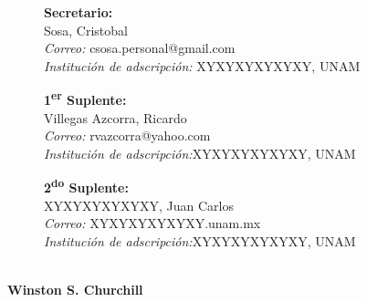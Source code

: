 \documentclass[11pt,twoside,openright,spanish]{report}
\numberwithin{equation}{chapter}
\numberwithin{figure}{chapter}
\numberwithin{table}{chapter}
\newenvironment{changemargin}[3]{
	\begin{list}{}{
			\setlength{\topsep}{#3}
			\setlength{\leftmargin}{#1}
			\setlength{\rightmargin}{#2}
			\setlength{\listparindent}{\parindent}
			\setlength{\itemindent}{\parindent}
			\setlength{\parsep}{\parskip}
		}
		\item[]}{\end{list}}
\begin{document}
\begin{changemargin}{1cm}{0cm}{1cm}
\begin{description}
			\item[]\textbf{Secretario:}\\
			Sosa, Cristobal\\
			\textit{Correo:} csosa.personal@gmail.com\\
			\textit{Institución de adscripción:} XYXYXYXYXYXY, UNAM
			\item[]\textbf{1\textsuperscript{er} Suplente:}\\
			Villegas Azcorra, Ricardo\\
			\textit{Correo:} rvazcorra@yahoo.com\\
			\textit{Institución de adscripción:}XYXYXYXYXYXY, UNAM
			\item[]\textbf{2\textsuperscript{do} Suplente:}\\
			XYXYXYXYXYXY, Juan Carlos\\
			\textit{Correo:} XYXYXYXYXYXY.unam.mx\\
			\textit{Institución de adscripción:}XYXYXYXYXYXY, UNAM
		\end{description}
		\thispagestyle{empty}
	\end{changemargin}
	
	
	\ChTitleVar{\raggedright\Large\sffamily\bfseries}
	
	\evensidemargin 0in 
	\oddsidemargin 0.6in
	
	\newpage{\ } 
	\thispagestyle{empty}
	
	\begin{dedication}
		{\Large{}}\\
		\vspace{0.5cm}
		{\normalsize{\bfseries{Winston S. Churchill}}}
	\end{dedication}
	
	\newpage
	$\ $
	\thispagestyle{empty} %
	
\end{document}
